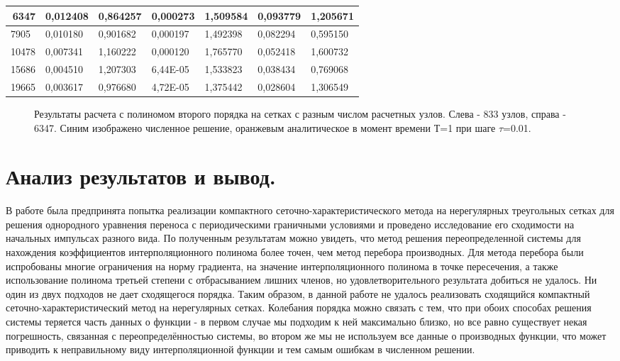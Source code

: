 \documentclass[14pt]{article}
\begin{document}
\begin{table}[]
\begin{tabular}{|r|l|l|l|l|l|l|}
6347                        & 0,012408 & 0,864257               & 0,000273 & 1,509584 & 0,093779 & 1,205671               \\ \hline
\multicolumn{1}{|l|}{7905}  & 0,010180 & 0,901682               & 0,000197 & 1,492398 & 0,082294 & 0,595150               \\ \hline
\multicolumn{1}{|l|}{10478} & 0,007341 & 1,160222               & 0,000120 & 1,765770 & 0,052418 & 1,600732               \\ \hline
\multicolumn{1}{|l|}{15686} & 0,004510 & 1,207303               & 6,44E-05 & 1,533823 & 0,038434 & 0,769068               \\ \hline
\multicolumn{1}{|l|}{19665} & 0,003617 & 0,976680               & 4,72E-05 & 1,375442 & 0,028604 & 1,306549               \\ \hline
\end{tabular}
\end{table}
\begin{figure}[H]
\caption{Результаты расчета с полиномом второго порядка на сетках с разным числом расчетных узлов. Слева - 833 узлов, справа - 6347. Синим изображено численное решение, оранжевым аналитическое в момент времени Т=1 при шаге $\tau$=0.01.}
\end{figure}
\section{Анализ результатов и вывод.}
В работе была предпринята попытка реализации компактного сеточно-характеристического метода на нерегулярных треугольных сетках для решения однородного уравнения переноса с периодическими граничными условиями и проведено исследование его сходимости на начальных импульсах разного вида. По полученным результатам можно увидеть, что метод решения переопределенной системы для нахождения коэффициентов интерполяционного полинома более точен, чем метод перебора производных. Для метода перебора были испробованы многие ограничения на норму градиента, на значение интерполяционного полинома в точке пересечения, а также использование полинома третьей степени с отбрасыванием лишних членов, но удовлетворительного результата добиться не удалось. Ни один из двух подходов не дает сходящегося порядка. Таким образом, в данной работе не удалось реализовать сходящийся компактный сеточно-характеристический метод на нерегулярных сетках. Колебания порядка можно связать с тем, что при обоих способах решения системы теряется часть данных о функции - в первом случае мы подходим к ней максимально близко, но все равно существует некая погрешность, связанная с переопределённостью системы, во втором же мы не используем все данные о производных функции, что может приводить к неправильному виду интерполяционной функции и тем самым ошибкам в численном решении.
\end{document}
